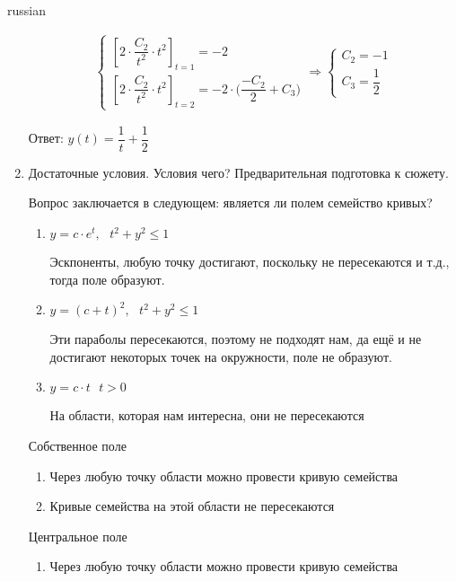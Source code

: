 \documentclass{article}
\begin{document}
\begin{otherlanguage*}{russian}
\begin{enumerate}
\begin{align*}
\begin{cases}
[2 \cdot \dfrac{C_2}{t^2} \cdot t ^ 2 ]_{t=1} = -2  \\
[2 \cdot \dfrac{C_2}{t^2} \cdot t^2 ]_{t=2} = -2 \cdot \Big( \dfrac{-C_2}{2} + C_3 \Big)
\end{cases} \Rightarrow
\begin{cases}
C_2 = -1 \\
C_3 = \dfrac{1}{2}
\end{cases} 
\end{align*}

Ответ: $ y(t) = \dfrac{1}{t} + \dfrac{1}{2} $ 

\item Достаточные условия. Условия чего? Предварительная подготовка к сюжету. 

Вопрос заключается в следующем: является ли полем семейство кривых?

\begin{enumerate}

\item $ y = c \cdot e ^ t, \,\,\,\, t^ 2 + y ^ 2 \le 1 $ 

Эскпоненты, любую точку достигают, поскольку не пересекаются и т.д., тогда поле образуют.

\item $ y = (c + t ) ^ 2, \,\,\,\, t^ 2+ y^2 \le 1 $ 

Эти параболы пересекаются, поэтому не подходят нам, да ещё и не достигают некоторых точек на окружности, поле не образуют. 

\item $ y = c \cdot t \,\,\,\, t > 0 $ 

На области, которая нам интересна, они не пересекаются 

\end{enumerate}

Собственное поле 
\begin{enumerate}
\item Через любую точку области можно провести кривую семейства 

\item Кривые семейства на этой области не пересекаются 
\end{enumerate}

Центральное поле 
\begin{enumerate}
\item Через любую точку области можно провести кривую семейства 


\end{enumerate}
\end{enumerate}
\end{otherlanguage*}
\end{document}
